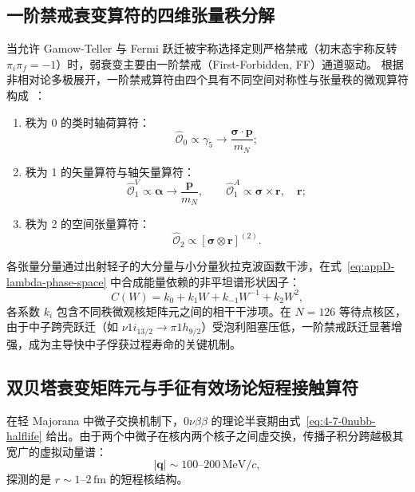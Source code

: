 \subsection{一阶禁戒衰变算符的四维张量秩分解}

当允许 Gamow-Teller 与 Fermi 跃迁被宇称选择定则严格禁戒（初末态宇称反转 $\pi_i \pi_f = -1$）时，弱衰变主要由一阶禁戒（First-Forbidden, FF）通道驱动。
根据非相对论多极展开，一阶禁戒算符由四个具有不同空间对称性与张量秩的微观算符构成~\cite{doctoral-r1-g34-zhi-2013-prc-shell-model-half-lives}：
\begin{enumerate}
\item 秩为 0 的类时轴荷算符：
\begin{equation}\label{eq:appD-ff-rank0}
\hat{\mathcal{O}}_0 \propto \gamma_5 \to \frac{\boldsymbol{\sigma} \cdot \mathbf{p}}{m_N};
\end{equation}
\item 秩为 1 的矢量算符与轴矢量算符：
\begin{equation}\label{eq:appD-ff-rank1}
\hat{\mathcal{O}}_1^V \propto \boldsymbol{\alpha} \to \frac{\mathbf{p}}{m_N}, \qquad \hat{\mathcal{O}}_1^A \propto \boldsymbol{\sigma} \times \mathbf{r}, \quad \mathbf{r};
\end{equation}
\item 秩为 2 的空间张量算符：
\begin{equation}\label{eq:appD-ff-rank2}
\hat{\mathcal{O}}_2 \propto [\boldsymbol{\sigma} \otimes \mathbf{r}]^{(2)}.
\end{equation}
\end{enumerate}
各张量分量通过出射轻子的大分量与小分量狄拉克波函数干涉，在式~\eqref{eq:appD-lambda-phase-space} 中合成能量依赖的非平坦谱形状因子：
\begin{equation}\label{eq:appD-ff-shape-factor}
C(W) = k_0 + k_1 W + k_{-1} W^{-1} + k_2 W^2,
\end{equation}
各系数 $k_i$ 包含不同秩微观核矩阵元之间的相干干涉项。在 $N=126$ 等待点核区，由于中子跨壳跃迁（如 $\nu 1i_{13/2} \to \pi 1h_{9/2}$）受泡利阻塞压低，一阶禁戒跃迁显著增强，成为主导快中子俘获过程寿命的关键机制。

\subsection{双贝塔衰变矩阵元与手征有效场论短程接触算符}

在轻 Majorana 中微子交换机制下，$0\nu\beta\beta$ 的理论半衰期由式~\eqref{eq:4-7-0nubb-halflife} 给出。由于两个中微子在核内两个核子之间虚交换，传播子积分跨越极其宽广的虚拟动量谱：
\begin{equation}\label{eq:appD-0nubb-virtual-momentum}
|\mathbf{q}| \sim 100\text{--}200\,\mathrm{MeV}/c,
\end{equation}
探测的是 $r \sim 1$–$2\,\text{fm}$ 的短程核结构。

